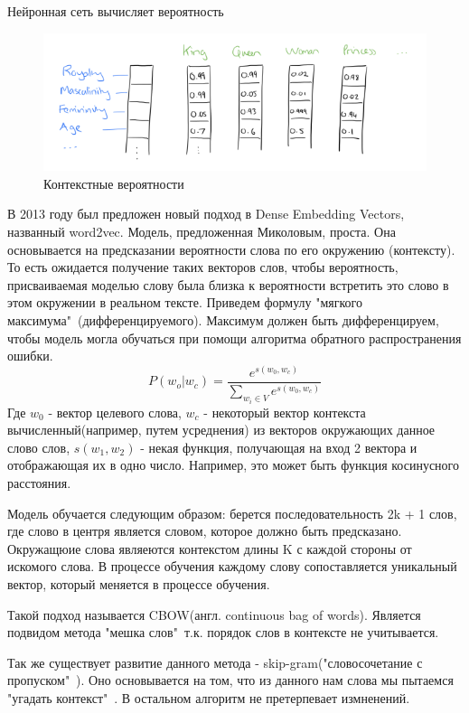 Нейронная сеть вычисляет вероятность
\begin{figure}[!h]
	\centering
	\includegraphics[width=.5\textwidth]{master_img/dense_emb_example.png}
	\caption{Контекстные вероятности}
	\label{fig06_master}
\end{figure}

В 2013 году был предложен новый подход в Dense Embedding Vectors, названный word2vec.
Модель, предложенная Миколовым\cite{Book28}, проста. Она основывается на  предсказании вероятности слова по его окружению (контексту). То есть ожидается получение таких векторов слов, чтобы вероятность, присваиваемая моделью слову была близка к вероятности встретить это слово в этом окружении в реальном тексте.
Приведем формулу "мягкого максимума"\ (дифференцируемого). Максимум должен быть дифференцируем, чтобы модель могла обучаться при помощи алгоритма обратного распространения ошибки.
\begin{equation}
P(w_o|w_c) = \frac{e^{s(w_0, w_c)}}{\sum_{w_i \in V}e^{s(w_0, w_c)}}
\end{equation}
Где $w_0$ - вектор целевого слова, $w_c$  - некоторый вектор контекста вычисленный(например, путем усреднения) из векторов окружающих данное слово слов, $s(w_1, w_2)$  - некая функция, получающая на вход 2 вектора и отображающая их в одно число. Например, это может быть функция косинусного расстояния.

Модель обучается следующим образом: берется последовательность 2k + 1 слов, где слово в центря является словом, которое должно быть предсказано. Окружащюие слова являеются контекстом длины K с каждой стороны от искомого слова. В процессе обучения каждому слову сопоставляется уникальный вектор, который меняется в процессе обучения.

Такой подход называется CBOW(англ. continuous bag of words). Является подвидом метода "мешка слов"\ т.к. порядок слов в контексте не учитывается. 

Так же существует развитие данного метода - skip-gram\cite{Book28}("словосочетание с пропуском"\ ). Оно основывается на том, что  из данного нам слова мы пытаемся "угадать контекст"\ . В остальном алгоритм не претерпевает измненений.

